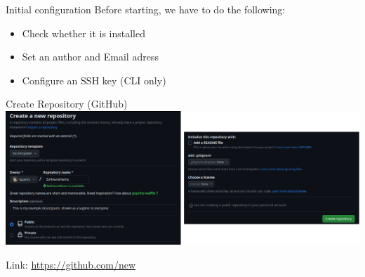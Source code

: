 \documentclass[compress,aspectratio=169]{beamer}
\begin{document}
  \begin{frame}{Initial configuration}
    Before starting, we have to do the following:
    \begin{itemize}
      \item Check whether it is installed
      \item Set an author and Email adress
      \item Configure an SSH key (CLI only)
    \end{itemize}
  \end{frame}

  \begin{frame}{Create Repository (GitHub)}
    \includegraphics[width=\textwidth]{./assets/gh.png}
    \begin{center}
      Link: \href{https://github.com/new}{\url{https://github.com/new}}
    \end{center}
  \end{frame}
\end{document}
